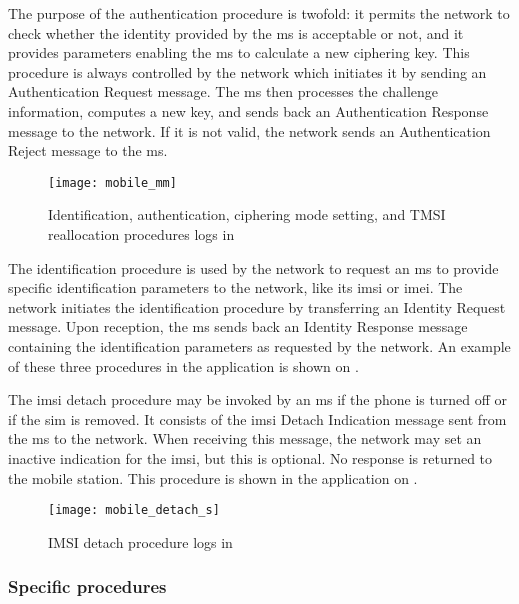     The purpose of the authentication procedure is twofold: it permits
    the network to check whether the identity provided by the \gls{ms}
    is acceptable or not, and it provides parameters enabling the
    \gls{ms} to calculate a new ciphering key. This procedure is always
    controlled by the network which initiates it by sending an
    Authentication Request message. The \gls{ms} then processes the
    challenge information, computes a new key, and sends back an
    Authentication Response message to the network. If it is not valid,
    the network sends an Authentication Reject message to the \gls{ms}.

      \begin{figure}
        \centering
        \texttt{[image: mobile\_mm]}
        \caption{Identification, authentication, ciphering mode setting, and TMSI
        reallocation procedures logs in }
        \label{fig:mobile_mm}
      \end{figure}

    The identification procedure is used by the network to request an
    \gls{ms} to provide specific identification parameters to the
    network, like its \gls{imsi} or \gls{imei}. The network initiates
    the identification procedure by transferring an Identity Request
    message. Upon reception, the \gls{ms} sends back an Identity
    Response message containing the identification parameters as
    requested by the network. An example of these three procedures in
    the  application is shown on .

    The \gls{imsi} detach procedure may be invoked by an \gls{ms} if the
    phone is turned off or if the \gls{sim} is removed. It consists of
    the \gls{imsi} Detach Indication message sent from the \gls{ms} to
    the network. When receiving this message, the network may set an
    inactive indication for the \gls{imsi}, but this is optional. No
    response is returned to the mobile station. This procedure is shown
    in the  application on .

      \begin{figure}
        \centering
        \texttt{[image: mobile\_detach\_s]}
        \caption{IMSI detach procedure logs in }
        \label{fig:mobile_detach}
      \end{figure}

    \subsubsection{Specific procedures}
    \label{sec:mm_proc_spec}

